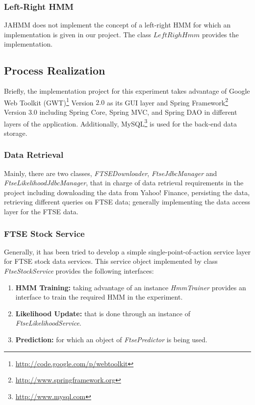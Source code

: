 \documentclass{acm_proc_article-sp}
\begin{document}
\subsubsection{Left-Right HMM}
JAHMM does not implement the concept of a left-right HMM for which an implementation is given in our project. The class
$LeftRighHmm$ provides the implementation.

\subsection{Process Realization}
Briefly, the implementation project for this experiment takes advantage of Google Web Toolkit
(GWT)\footnote{\url{http://code.google.com/p/webtoolkit}} Version $2.0$ as its GUI layer and Spring
Framework\footnote{\url{http://www.springframework.org}} Version $3.0$ including Spring Core, Spring MVC, and Spring DAO
in different layers of the application. Additionally, MySQL\footnote{\url{http://www.mysql.com}} is used for the
back-end data storage.

\subsubsection{Data Retrieval}
Mainly, there are two classes, \textit{FTSEDownloader}, \textit{FtseJdbcManager} and \textit{FtseLikelihoodJdbcManager}, that
in charge of data retrieval requirements in the project including downloading the data from Yahoo! Finance, persisting the data,
retrieving different queries on FTSE data; generally implementing the data access layer for the FTSE data.

\subsubsection{FTSE Stock Service}
Generally, it has been tried to develop a simple single-point-of-action service layer for FTSE stock data services.
This service object implemented by class \textit{FtseStockService} provides the following interfaces:
\begin{enumerate}
  \item \textbf{HMM Training:} taking advantage of an instance \textit{HmmTrainer} provides an interface to train the required
  HMM in the experiment.
  \item \textbf{Likelihood Update:} that is done through an instance of \textit{FtseLikelihoodService}.
  \item \textbf{Prediction:} for which an object of \textit{FtsePredictor} is being used.
\end{enumerate}
\end{document}
